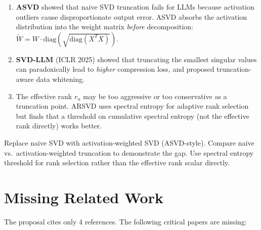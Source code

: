 \documentclass[11pt,a4paper]{article}
\begin{document}
\begin{enumerate}
    \item \textbf{ASVD} \cite{yuan2023asvd} showed that naive SVD truncation fails for LLMs because activation outliers cause disproportionate output error. ASVD absorbs the activation distribution into the weight matrix \emph{before} decomposition: $\tilde{W} = W \cdot \text{diag}(\sqrt{\text{diag}(X^T X)})$.

    \item \textbf{SVD-LLM} (ICLR 2025) \cite{wang2024svdllm} showed that truncating the smallest singular values can paradoxically lead to \emph{higher} compression loss, and proposed truncation-aware data whitening.

    \item The effective rank $r_u$ may be too aggressive or too conservative as a truncation point. ARSVD \cite{cherukuri2025arsvd} uses spectral entropy for adaptive rank selection but finds that a threshold on cumulative spectral entropy (not the effective rank directly) works better.
\end{enumerate}

\begin{fixbox}
Replace naive SVD with activation-weighted SVD (ASVD-style). Compare naive vs.\ activation-weighted truncation to demonstrate the gap. Use spectral entropy threshold for rank selection rather than the effective rank scalar directly.
\end{fixbox}

\section{Missing Related Work}

The proposal cites only 4 references. The following critical papers are missing:
\end{document}
